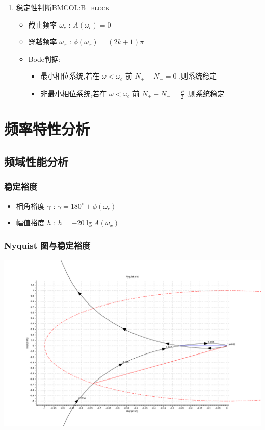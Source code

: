 \documentclass[table]{beamer}
\begin{document}
\begin{enumerate}
\item 稳定性判断\hfill{}\textsc{BMCOL:B\_block}
\label{sec:org150b73c}
\begin{itemize}
\item 截止频率 \(\omega_c\) : \(A(\omega_c)=0\)
\item 穿越频率 \(\omega_x\) : \(\phi(\omega_x)=(2k+1)\pi\)
\item <3->Bode判据:
\begin{itemize}
\item 最小相位系统,若在 \(\omega<\omega_c\) 前 \(N_+-N_-=0\) ,则系统稳定
\item 非最小相位系统,若在 \(\omega<\omega_c\) 前 \(N_+-N_-=\frac{P}{2}\) ,则系统稳定
\end{itemize}
\end{itemize}
\end{enumerate}
\section{频率特性分析}
\label{sec:orgca555b7}
\subsection{频域性能分析}
\label{sec:org60909f2}
\subsubsection{稳定裕度}
\label{sec:org0dfd771}
\begin{itemize}
\item 相角裕度 \(\gamma\) : \(\gamma=180^{\circ}+\phi(\omega_c)\)
\item 幅值裕度 \(h\) : \(h=-20\lg A(\omega_x)\)
\end{itemize}

\subsubsection{Nyquist 图与稳定裕度}
\label{sec:orgfcbcd2a}
\begin{center}
\includegraphics[width=.9\linewidth]{image/margin_nyquist_scilab.pdf}
\end{center}
\end{document}
